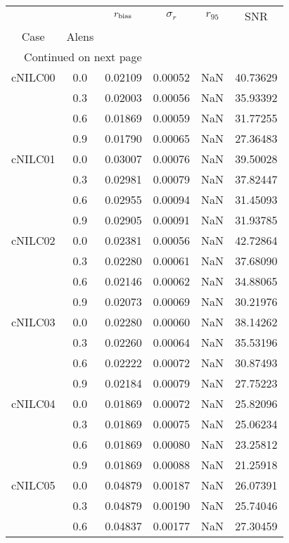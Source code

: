\begin{longtable}{cccccc}
\toprule
        &     &  $r_{\rm bias}$  &  $\sigma_r$ &  $r_{95}$ &      SNR \\
Case & Alens &                  &             &           &          \\
\midrule
\endhead
\midrule
\multicolumn{3}{r}{{Continued on next page}} \\
\midrule
\endfoot

\bottomrule
\endlastfoot
cNILC00 & 0.0 & 0.02109 & 0.00052 & NaN & 40.73629 \\
        & 0.3 & 0.02003 & 0.00056 & NaN & 35.93392 \\
        & 0.6 & 0.01869 & 0.00059 & NaN & 31.77255 \\
        & 0.9 & 0.01790 & 0.00065 & NaN & 27.36483 \\
cNILC01 & 0.0 & 0.03007 & 0.00076 & NaN & 39.50028 \\
        & 0.3 & 0.02981 & 0.00079 & NaN & 37.82447 \\
        & 0.6 & 0.02955 & 0.00094 & NaN & 31.45093 \\
        & 0.9 & 0.02905 & 0.00091 & NaN & 31.93785 \\
cNILC02 & 0.0 & 0.02381 & 0.00056 & NaN & 42.72864 \\
        & 0.3 & 0.02280 & 0.00061 & NaN & 37.68090 \\
        & 0.6 & 0.02146 & 0.00062 & NaN & 34.88065 \\
        & 0.9 & 0.02073 & 0.00069 & NaN & 30.21976 \\
cNILC03 & 0.0 & 0.02280 & 0.00060 & NaN & 38.14262 \\
        & 0.3 & 0.02260 & 0.00064 & NaN & 35.53196 \\
        & 0.6 & 0.02222 & 0.00072 & NaN & 30.87493 \\
        & 0.9 & 0.02184 & 0.00079 & NaN & 27.75223 \\
cNILC04 & 0.0 & 0.01869 & 0.00072 & NaN & 25.82096 \\
        & 0.3 & 0.01869 & 0.00075 & NaN & 25.06234 \\
        & 0.6 & 0.01869 & 0.00080 & NaN & 23.25812 \\
        & 0.9 & 0.01869 & 0.00088 & NaN & 21.25918 \\
cNILC05 & 0.0 & 0.04879 & 0.00187 & NaN & 26.07391 \\
        & 0.3 & 0.04879 & 0.00190 & NaN & 25.74046 \\
        & 0.6 & 0.04837 & 0.00177 & NaN & 27.30459 \\

\end{longtable}
